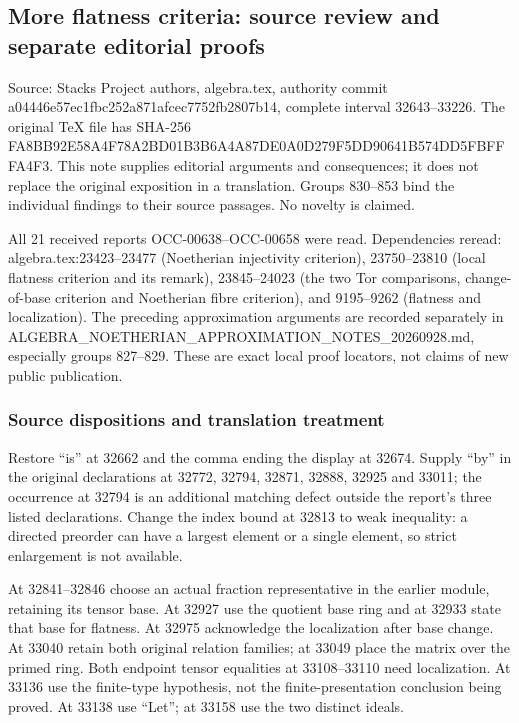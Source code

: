 \subsection{More flatness criteria: source review and separate editorial proofs}\label{more-flatness-criteria-source-review-and-separate-editorial-proofs}

Source: Stacks Project authors, algebra.tex, authority commit a04446e57ec1fbc252a871afcec7752fb2807b14, complete interval 32643--33226. The original TeX file has SHA-256 FA8BB92E58A4F78A2BD01B3B6A4A87DE0A0D279F5DD90641B574DD5FBFFFA4F3. This note supplies editorial arguments and consequences; it does not replace the original exposition in a translation. Groups 830--853 bind the individual findings to their source passages. No novelty is claimed.

All 21 received reports OCC-00638--OCC-00658 were read. Dependencies reread: algebra.tex:23423--23477 (Noetherian injectivity criterion), 23750--23810 (local flatness criterion and its remark), 23845--24023 (the two Tor comparisons, change-of-base criterion and Noetherian fibre criterion), and 9195--9262 (flatness and localization). The preceding approximation arguments are recorded separately in ALGEBRA\_NOETHERIAN\_APPROXIMATION\_NOTES\_20260928.md, especially groups 827--829. These are exact local proof locators, not claims of new public publication.

\subsubsection{Source dispositions and translation treatment}\label{source-dispositions-and-translation-treatment}

Restore ``is'' at 32662 and the comma ending the display at 32674. Supply ``by'' in the original declarations at 32772, 32794, 32871, 32888, 32925 and 33011; the occurrence at 32794 is an additional matching defect outside the report's three listed declarations. Change the index bound at 32813 to weak inequality: a directed preorder can have a largest element or a single element, so strict enlargement is not available.

At 32841--32846 choose an actual fraction representative in the earlier module, retaining its tensor base. At 32927 use the quotient base ring and at 32933 state that base for flatness. At 32975 acknowledge the localization after base change. At 33040 retain both original relation families; at 33049 place the matrix over the primed ring. Both endpoint tensor equalities at 33108--33110 need localization. At 33136 use the finite-type hypothesis, not the finite-presentation conclusion being proved. At 33138 use ``Let''; at 33158 use the two distinct ideals.

